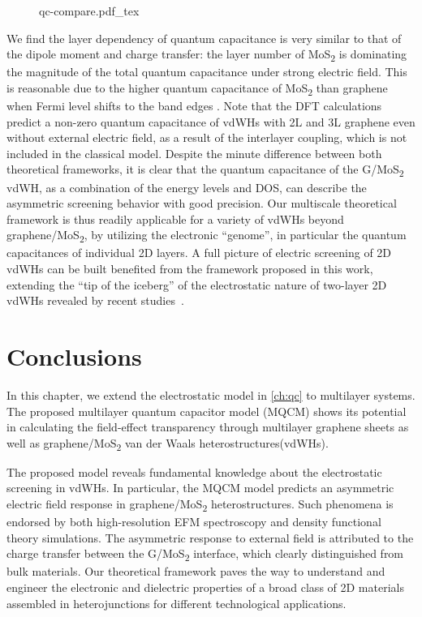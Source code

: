 \begin{figure}[!htbp]
  {qc-compare.pdf_tex}
  \caption{\label{fig:asym-qc} }
\end{figure}
%
We find the layer dependency of quantum capacitance is very
similar to that of the dipole moment and charge transfer: the layer
number of MoS\textsubscript{2} is dominating the magnitude of the
total quantum capacitance under strong electric field. This is
reasonable due to the higher quantum capacitance of
MoS\textsubscript{2} than graphene when Fermi level shifts to the band
edges .
%
Note that the DFT calculations predict a non-zero quantum capacitance
of vdWHs with 2L and 3L graphene even without external electric field,
as a result of the interlayer coupling, which is not included in the
classical model. Despite the minute difference between both
theoretical frameworks, it is clear that the quantum capacitance of
the G/MoS\textsubscript{2} vdWH, as a combination of the energy levels and DOS, can
describe the asymmetric screening behavior with good precision. Our
multiscale theoretical framework is thus readily applicable for a
variety of vdWHs beyond graphene/MoS\textsubscript{2}, by utilizing the electronic
“genome”, in particular the quantum capacitances of individual 2D
layers. A full picture of electric screening of 2D vdWHs can be built
benefited from the framework proposed in this work, extending the “tip
of the iceberg” of the electrostatic nature of two-layer 2D vdWHs
revealed by recent
studies~\cite{Chu_2017_eh_tunneling,Lee_2014_pn_vdw_het,Furchi_2014_PV_vdwH}.

\section{Conclusions}
\label{sec:asym-conclusions}


In this chapter, we extend the electrostatic model in \autoref{ch:qc}
to multilayer systems. The proposed multilayer quantum capacitor model
(MQCM) shows its potential in calculating the field-effect
transparency through multilayer graphene sheets as well as
graphene/MoS\textsubscript{2} van der Waals heterostructures(vdWHs). 

The proposed model reveals fundamental knowledge about the
electrostatic screening in vdWHs.
In particular, the MQCM model predicts an
asymmetric electric field response in
graphene/MoS\textsubscript{2} heterostructures. Such phenomena is endorsed by
both high-resolution EFM spectroscopy
and density functional theory simulations.
%
The asymmetric response to external field is attributed to the charge transfer between the G/MoS\textsubscript{2} interface, which clearly distinguished from bulk materials.
%
Our theoretical framework paves the way to
understand and engineer the electronic and dielectric properties of a
broad class of 2D materials assembled in heterojunctions for different
technological applications.


